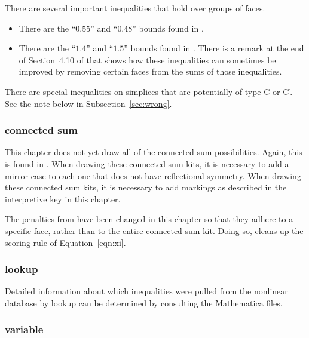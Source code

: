 There are several important inequalities that hold over groups of
faces.

\begin{itemize}
  \item There are the ``$0.55$'' and ``$0.48$'' bounds found in
  \cite[Lemma 10.6,p.101]{DCG}.
  \item There are the ``$1.4$'' and ``$1.5$'' bounds found in
  \cite[Lemma~22.12,p.233]{DCG}.  There is a remark at the end of
  Section~4.10 of \cite[VI,p.37]{Hal98D} that shows how these
  inequalities can sometimes be improved by removing certain faces
  from the sums of those inequalities.
\end{itemize}


There are special inequalities on simplices that are potentially
of type C or C'.  See the note below in
Subsection~\ref{sec:wrong}.





\subsubsection{connected sum}

This chapter does not yet draw all of the connected sum possibilities.
Again, this is found in \cite[Sec.25.5--25.6,pp.249--251]{DCG}.
When drawing these connected sum kits, it is necessary to add a mirror
case to each one that does not have reflectional symmetry.  When
drawing these connected sum kits, it is necessary to add markings as
described in the interpretive key in this chapter.

The penalties from \cite{DCG} have been changed in this chapter
so that they adhere to a specific face, rather than to the entire
connected sum kit.  Doing so, cleans up the scoring rule of
Equation~\ref{eqn:xi}.




\subsubsection{lookup}

Detailed information about which inequalities were pulled from the
nonlinear database by lookup can be determined by consulting the
Mathematica files.





\subsubsection{variable}

